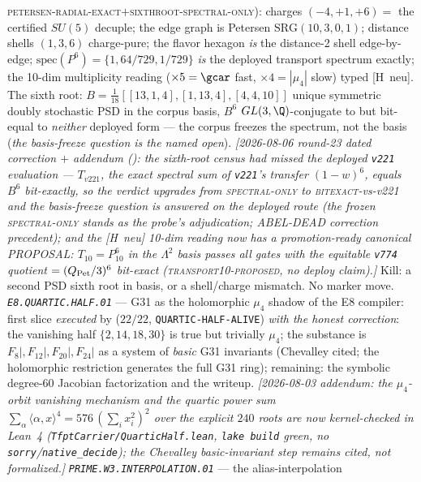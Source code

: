 \textsc{petersen-radial-exact}$+$\textsc{sixthroot-spectral-only}):
charges $(-4,+1,+6)=$ the certified $SU(5)$ decuple; the edge
graph is Petersen $\mathrm{SRG}(10,3,0,1)$; distance shells
$(1,3,6)$ charge-pure; the flavor hexagon \emph{is} the distance-2
shell edge-by-edge; $\mathrm{spec}(P^6)=\{1,64/729,1/729\}$
\emph{is} the deployed transport spectrum exactly; the 10-dim
multiplicity reading ($\times5=\gcar$ fast, $\times4=|\mu_4|$
slow) typed [H~neu].  The sixth root:
$B=\tfrac1{18}[[13,1,4],[1,13,4],[4,4,10]]$ unique symmetric
doubly stochastic PSD in the corpus basis, $B^6$
$GL(3,\Q)$-conjugate to but bit-equal to \emph{neither} deployed
form --- the corpus freezes the spectrum, not the basis
(\emph{the basis-freeze question is the named open}).
\emph{[2026-08-06 round-23 dated correction $+$ addendum
(): the sixth-root census
had missed the deployed \texttt{v221} evaluation --- $T_{v221}$,
the exact spectral sum of \texttt{v221}'s transfer $(1-w)^6$,
equals $B^6$ \emph{bit-exactly}, so the verdict upgrades from
\textsc{spectral-only} to \textsc{bitexact}-vs-v221 and the
basis-freeze question is \emph{answered} on the deployed route
(the frozen \textsc{spectral-only} stands as the probe's
adjudication; ABEL-DEAD correction precedent); and the [H~neu]
10-dim reading now has a promotion-ready canonical PROPOSAL:
$T_{10}=P_{10}^6$ in the $\Lambda^2$ basis passes all gates with
the equitable \texttt{v774} quotient $=(Q_{\rm Pet}/3)^6$
bit-exact (\textsc{transport10-proposed}, no deploy claim).]}
Kill: a
second PSD sixth root in basis, or a shell/charge mismatch.  No
marker move.
\emph{\texttt{E8.QUARTIC.HALF.01}} --- G31 as the holomorphic $\mu_4$
shadow of the E8 compiler: first slice \emph{executed} by
 ($22/22$, \texttt{QUARTIC-HALF-ALIVE})
\emph{with the honest correction}: the vanishing half
$\{2,14,18,30\}$ is true but trivially $\mu_4$; the substance is
$F_8|,F_{12}|,F_{20}|,F_{24}|$ as a system of \emph{basic} G31
invariants (Chevalley cited; the holomorphic restriction generates
the full G31 ring); remaining: the symbolic degree-60 Jacobian
factorization and the writeup.  \emph{[2026-08-03 addendum: the
$\mu_4$-orbit vanishing mechanism and the quartic power sum
$\sum_\alpha\langle\alpha,x\rangle^4=576\,(\sum_ix_i^2)^2$ over the
explicit $240$ roots are now kernel-checked in Lean~4
(\texttt{TfptCarrier/QuarticHalf.lean}, \texttt{lake build} green, no
\texttt{sorry}/\texttt{native\_decide}); the Chevalley
basic-invariant step remains cited, not formalized.]}
\emph{\texttt{PRIME.W3.INTERPOLATION.01}} --- the alias-interpolation
